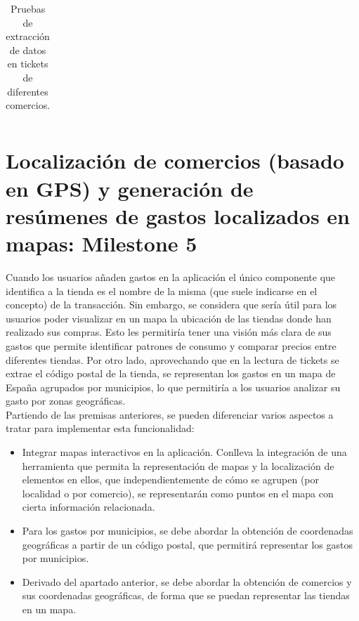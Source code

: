 \begin{landscape}
\begin{table}[]
\begin{tabular}{|p{3cm}|p{3cm}|l|l|l|l|p{3cm}|l|}
    \end{tabular}
    \caption{Pruebas de extracción de datos en tickets de diferentes comercios.}
    \label{tab:pruebas_extraccion_datos}
    \end{table}
\end{landscape}
    


\section{Localización de comercios (basado en GPS) y generación de resúmenes de gastos localizados en mapas: Milestone 5}\label{milestone5}
Cuando los usuarios añaden gastos en la aplicación el único componente que identifica a la tienda es el nombre de la misma (que suele indicarse en el concepto) de la transacción. Sin embargo, se considera que sería útil para los usuarios poder visualizar en un mapa la ubicación de las tiendas donde han realizado sus compras. Esto les permitiría tener una visión más clara de sus gastos que permite identificar patrones de consumo y comparar precios entre diferentes tiendas. Por otro lado, aprovechando que en la lectura de tickets se extrae el código postal de la tienda, se representan los gastos en un mapa de España agrupados por municipios, lo que permitiría a los usuarios analizar su gasto por zonas geográficas.\\

Partiendo de las premisas anteriores, se pueden diferenciar varios aspectos a tratar para implementar esta funcionalidad:

\begin{itemize}
    \item Integrar mapas interactivos en la aplicación. Conlleva la integración de una herramienta que permita la representación de mapas y la localización de elementos en ellos, que independientemente de cómo se agrupen (por localidad o por comercio), se representarán como puntos en el mapa con cierta información relacionada.
    \item  Para los gastos por municipios, se debe abordar la obtención de coordenadas geográficas a partir de un código postal, que permitirá representar los gastos por municipios.
    \item Derivado del apartado anterior, se debe abordar la obtención de comercios y sus coordenadas geográficas, de forma que se puedan representar las tiendas en un mapa.  
\end{itemize}


